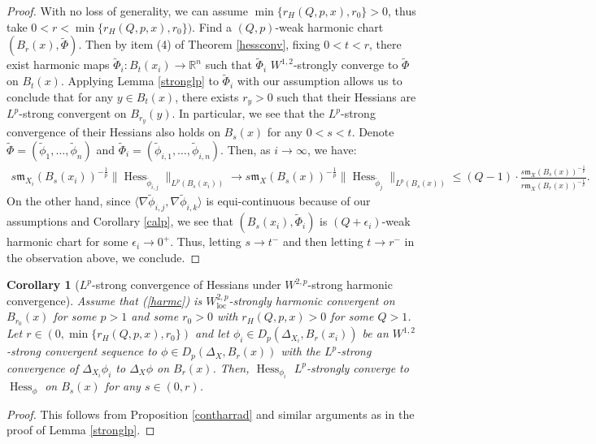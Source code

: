 \documentclass[11pt,reqno]{amsart}
\newtheorem{corollary}[theorem]{Corollary}
\theoremstyle{definition}
\numberwithin{equation}{section}
\newcommand{\meas}{\mathfrak{m}}
\DeclareMathOperator{\Hess}{Hess}
\DeclareMathOperator{\loc}{loc}
\begin{document}
\begin{proof}
With no loss of generality, we can assume $\min \{r_H(Q, p, x), r_0\}>0$, thus take $0<r< \min \{r_H(Q, p, x), r_0\})$.
Find a $(Q, p)$-weak harmonic chart $(B_{r}(x), \tilde \Phi)$. Then by item (4) of Theorem \ref{hessconv}, fixing $0<t<r$, there exist harmonic maps $\tilde \Phi_i:B_t(x_i) \to \mathbb{R}^n$ such that $\tilde \Phi_i$ $W^{1,2}$-strongly converge to $\tilde \Phi$ on $B_t(x)$.
Applying Lemma \ref{stronglp} to $\tilde \Phi_i$ with our assumption allows us to conclude that for any $y \in B_t(x)$, there exists $r_y>0$ such that their Hessians are $L^p$-strong convergent on $B_{r_y}(y)$. In particular, we see that the $L^p$-strong convergence of their Hessians also holds on $B_s(x)$ for any $0<s<t$. Denote $\tilde \Phi=(\tilde \phi_1, \ldots, \tilde \phi_n)$ and  $\tilde \Phi_i=(\tilde \phi_{i, 1}, \ldots, \tilde \phi_{i, n})$. Then, as  $i \to \infty$, we have:
\begin{align*}
s\meas_{X_i}(B_s(x_i))^{-\frac{1}{p}}\|\Hess_{\tilde \phi_{i, j}}\|_{L^p(B_s(x_i))}\to s\meas_X(B_s(x))^{-\frac{1}{p}}\|\Hess_{\tilde \phi_j}\|_{L^p(B_s(x))} \le (Q-1)\cdot \frac{s\meas_X(B_s(x))^{-\frac{1}{p}}}{r\meas_X (B_r(x))^{-\frac{1}{p}}}.
\end{align*}
On the other hand, since $\langle \nabla \tilde \phi_{i, j}, \nabla \tilde \phi_{i, k}\rangle$ is equi-continuous because of our assumptions and Corollary \ref{calp}, we see that $(B_s(x_i), \tilde \Phi_i)$ is $(Q+\epsilon_i)$-weak harmonic chart for some $\epsilon_i \to 0^+$.
Thus, letting $s \to t^-$ and then letting $t \to r^-$ in the observation above, we conclude.
\end{proof}
\begin{corollary}[$L^p$-strong convergence of Hessians under $W^{2,p}$-strong harmonic convergence]\label{newharmonic}
Assume that (\ref{harmc}) is $W^{2, p}_{\loc}$-strongly harmonic convergent on $B_{r_0}(x)$ for some $p>1$ and some $r_0>0$ with
$
    r_H(Q, p, x)>0
$ for some $Q>1$.
Let $r \in (0, \min \{r_H(Q, p, x), r_0\})$ and let $\phi_i \in D_p(\Delta_{X_i}, B_{r}(x_i))$ be an
$W^{1,2}$-strong convergent sequence to $\phi \in D_p(\Delta_X, B_{r}(x))$ with the $L^p$-strong convergence of $\Delta_{X_i}\phi_i$ to $\Delta_X\phi$ on $B_{r}(x)$.
Then, $\Hess_{\phi_i}$ $L^p$-strongly converge to $\Hess_{\phi}$ on $B_s(x)$ for any $s \in (0, r)$.
\end{corollary}
\begin{proof}
    This follows from Proposition \ref{contharrad} and similar arguments as in the proof of Lemma \ref{stronglp}.
\end{proof}
\end{document}

